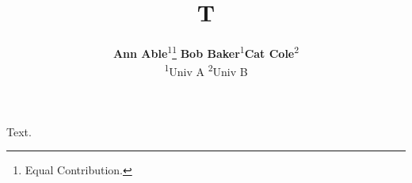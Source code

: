 \documentclass{article}
\title{T}
\author{\textbf{Ann Able}\textsuperscript{1}\thanks{Equal Contribution.}\quad
\textbf{Bob Baker}\textsuperscript{1}\samethanks[1]\quad \textbf{Cat Cole}\textsuperscript{2}\\
\textsuperscript{1}Univ A \quad \textsuperscript{2}Univ B}
\date{}
\begin{document}
\maketitle
Text.
\end{document}
